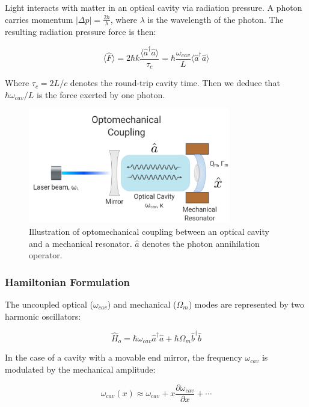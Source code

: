\documentclass[%
 reprint,
nofootinbib,
 amsmath,amssymb,
 aps,
]{revtex4-2}
\begin{document}
Light interacts with matter in an optical cavity via radiation pressure. A photon carries momentum $|\Delta p| = \frac{2h}{\lambda}$, where $\lambda$ is the wavelength of the photon. The resulting radiation pressure force is then:

\begin{equation*}
    \langle \hat{F} \rangle = 2 \hbar k \frac{\langle \hat{a}^\dagger \hat{a} \rangle}{\tau_c} = \hbar \frac{\omega_{cav}}{L}\langle \hat{a}^\dagger \hat{a} \rangle
\end{equation*}

Where $\tau_c = 2L/c$ denotes the round-trip cavity time. Then we deduce that $\hbar \omega_{cav}/L$ is the force exerted by one photon. 

\begin{figure}[ht]
    \centering
    \includegraphics [width=\columnwidth, height=5cm] {Optomechanical_diagram.PNG}
    \caption{Illustration of optomechanical coupling between an optical cavity and a mechanical resonator. $\hat{a}$ denotes the photon annihilation operator. }
    \label{fig:Optomechanical_diagram}
\end{figure}

\subsubsection{Hamiltonian Formulation}

The uncoupled optical ($\omega_{cav}$) and mechanical ($\Omega_m$) modes are represented by two harmonic oscillators:

\begin{equation*}
    \hat{H}_o = \hbar \omega_{cav} \hat{a}^\dagger \hat{a} + \hbar \Omega_m \hat{b}^\dagger \hat{b}
\end{equation*}

In the case of a cavity with a movable end mirror, the frequency $\omega_{cav}$ is modulated by the mechanical amplitude:

\begin{equation*}
    \omega_{cav}(x) \approx \omega_{cav}  + x\frac{\partial \omega_{cav}}{\partial x} + \cdots
\end{equation*}
\end{document}
